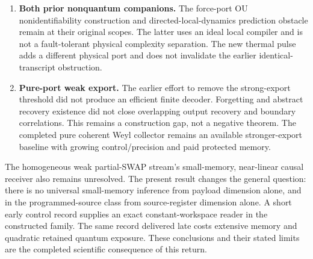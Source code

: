 \documentclass[11pt]{article}
\begin{document}
\begin{enumerate}
recovery retain their supplied physical resources.
\item \textbf{Both prior nonquantum companions.} The force-port OU
nonidentifiability construction and directed-local-dynamics prediction
obstacle remain at their original scopes. The latter uses an ideal local
compiler and is not a fault-tolerant physical complexity separation. The new
thermal pulse adds a different physical port and does not invalidate the
earlier identical-transcript obstruction.
\item \textbf{Pure-port weak export.} The earlier effort to remove the
strong-export threshold did not produce an efficient finite decoder.
Forgetting and abstract recovery existence did not close overlapping output
recovery and boundary correlations. This remains a construction gap, not a
negative theorem. The completed pure coherent Weyl collector remains an
available stronger-export baseline with growing control/precision and paid
protected memory.
\end{enumerate}

The homogeneous weak partial-SWAP stream's small-memory, near-linear causal
receiver also remains unresolved. The present result changes the general
question: there is no universal small-memory inference from payload dimension
alone, and in the programmed-source class from source-register dimension alone.
A short early control record supplies an exact constant-workspace reader in
the constructed family. The same record delivered late costs extensive memory
and quadratic retained quantum exposure. These conclusions and their stated
limits are the completed scientific consequence of this return.
\end{document}
